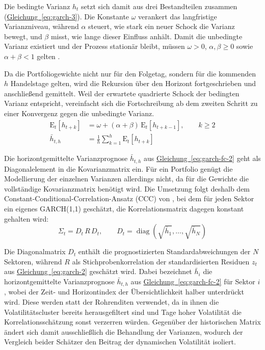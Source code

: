 \documentclass[a4paper, 12pt]{article}
\begin{document}
Die bedingte Varianz $h_t$ setzt sich damit aus drei Bestandteilen zusammen (\hyperref[eq:garch-3]{Gleichung~\ref*{eq:garch-3}}).
Die Konstante $\omega$ verankert das langfristige Varianzniveau, während $\alpha$ steuert, wie stark ein neuer Schock die Varianz bewegt, und $\beta$ misst, wie lange dieser Einfluss anhält.
Damit die unbedingte Varianz existiert und der Prozess stationär bleibt, müssen $\omega > 0$, $\alpha, \beta \geq 0$ sowie $\alpha + \beta < 1$ gelten \parencite{bollerslev1986}.

Da die Portfoliogewichte nicht nur für den Folgetag, sondern für die kommenden $h$ Handelstage gelten, wird die Rekursion über den Horizont fortgeschrieben und anschließend gemittelt.
Weil der erwartete quadrierte Schock der bedingten Varianz entspricht, vereinfacht sich die Fortschreibung ab dem zweiten Schritt zu einer Konvergenz gegen die unbedingte Varianz.
\begin{align}
	\label{eq:garch-fc-1}
	\mathrm{E}_t[h_{t+k}] &= \omega + (\alpha + \beta)\,\mathrm{E}_t[h_{t+k-1}], \qquad k \geq 2 \\
	\label{eq:garch-fc-2}
	\bar{h}_{t,h} &= \frac{1}{h}\sum_{k=1}^{h} \mathrm{E}_t[h_{t+k}]
\end{align}

Die horizontgemittelte Varianzprognose $\bar{h}_{t,h}$ aus \hyperref[eq:garch-fc-2]{Gleichung~\ref*{eq:garch-fc-2}} geht als Diagonalelement in die Kovarianzmatrix ein.
Für ein Portfolio genügt die Modellierung der einzelnen Varianzen allerdings nicht, da für die Gewichte die vollständige Kovarianzmatrix benötigt wird.
Die Umsetzung folgt deshalb dem Constant-Conditional-Correlation-Ansatz (CCC) von \textcite{bollerslev1990}, bei dem für jeden Sektor ein eigenes GARCH(1,1) geschätzt, die Korrelationsmatrix dagegen konstant gehalten wird:
\begin{equation}
	\Sigma_t = D_t\,R\,D_t, \qquad D_t = \operatorname{diag}\left(\sqrt{\bar{h}_{1}}, \dots, \sqrt{\bar{h}_{N}}\right)
	\label{eq:ccc}
\end{equation}

Die Diagonalmatrix $D_t$ enthält die prognostizierten Standardabweichungen der $N$ Sektoren, während $R$ als Stichprobenkorrelation der standardisierten Residuen $z_t$ aus \hyperref[eq:garch-2]{Gleichung~\ref*{eq:garch-2}} geschätzt wird.
Dabei bezeichnet $\bar{h}_i$ die horizontgemittelte Varianzprognose $\bar{h}_{t,h}$ aus \hyperref[eq:garch-fc-2]{Gleichung~\ref*{eq:garch-fc-2}} für Sektor $i$, wobei der Zeit- und Horizontindex der Übersichtlichkeit halber unterdrückt wird.
Diese werden statt der Rohrenditen verwendet, da in ihnen die Volatilitätscluster bereits herausgefiltert sind und Tage hoher Volatilität die Korrelationsschätzung sonst verzerren würden.
Gegenüber der historischen Matrix ändert sich damit ausschließlich die Behandlung der Varianzen, wodurch der Vergleich beider Schätzer den Beitrag der dynamischen Volatilität isoliert.
\end{document}
